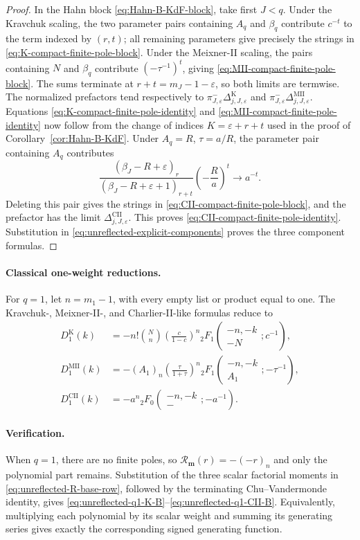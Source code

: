 \documentclass[10pt]{amsart}
\newcommand{\mm}{\boldsymbol m}
\newcommand{\pFq}[5]{{}_{#1}F_{#2}\!\left(\begin{matrix}#3\\#4\end{matrix};#5\right)}
\theoremstyle{plain}
\theoremstyle{definition}
\theoremstyle{remark}
\begin{document}
\begin{proof}
In the Hahn block \eqref{eq:Hahn-B-KdF-block}, take first $J<q$.
Under the Kravchuk scaling, the two parameter pairs containing
\(A_q\) and \(\beta_q\) contribute $c^{-t}$ to the term indexed by
\((r,t)\); all remaining parameters give precisely the strings in
\eqref{eq:K-compact-finite-pole-block}.  Under the Meixner-II scaling,
the pairs containing $N$ and \(\beta_q\) contribute
\((-\tau^{-1})^t\), giving
\eqref{eq:MII-compact-finite-pole-block}.  The sums terminate at
\(r+t=m_J-1-\varepsilon\), so both limits are termwise.  The normalized
prefactors tend respectively to
\(\pi_{J,\varepsilon}^{-}\Delta_{j,J,\varepsilon}^{\mathrm K}\)
and
\(\pi_{J,\varepsilon}^{-}\Delta_{j,J,\varepsilon}^{\mathrm{MII}}\).
Equations \eqref{eq:K-compact-finite-pole-identity} and
\eqref{eq:MII-compact-finite-pole-identity} now follow from the change of
indices $K=\varepsilon+r+t$ used in the proof of
Corollary~\ref{cor:Hahn-B-KdF}. Under
\(A_q=R\), \(\tau=a/R\), the parameter pair containing \(A_q\)
contributes
\[
 \frac{(\beta_J-R+\varepsilon)_r}
 {(\beta_J-R+\varepsilon+1)_{r+t}}
 \left(-\frac Ra\right)^t\longrightarrow a^{-t}.
\]
Deleting this pair gives the strings in
\eqref{eq:CII-compact-finite-pole-block}, and the prefactor has the
limit \(\Delta_{j,J,\varepsilon}^{\mathrm{CII}}\). This proves
\eqref{eq:CII-compact-finite-pole-identity}. Substitution in
\eqref{eq:unreflected-explicit-components} proves the three component
formulas.
\end{proof}

\paragraph{Classical one-weight reductions.}
For \(q=1\), let \(n=m_1-1\), with every empty list or product equal
to one. The Kravchuk-, Meixner-II-, and Charlier-II-like formulas reduce to
\begin{align}
 D_1^{\mathrm K}(k)
 &=-n!\binom Nn\left(\frac{c}{1-c}\right)^n
 \pFq{2}{1}{-n,-k}{-N}{c^{-1}},
 \label{eq:unreflected-q1-K-B}\\
 D_1^{\mathrm{MII}}(k)
 &=-(A_1)_n\left(\frac{\tau}{1+\tau}\right)^n
 \pFq{2}{1}{-n,-k}{A_1}{-\tau^{-1}},
 \label{eq:unreflected-q1-MII-B}\\
 D_1^{\mathrm{CII}}(k)
 &=-a^n\pFq{2}{0}{-n,-k}{-}{-a^{-1}}.
 \label{eq:unreflected-q1-CII-B}
\end{align}

\paragraph{Verification.}
When \(q=1\), there are no finite poles, so
\(\mathcal R_{\mm}(r)=-(-r)_n\) and only the polynomial part remains.
Substitution of the three scalar factorial moments in
\eqref{eq:unreflected-R-base-row}, followed by the terminating
Chu--Vandermonde identity, gives
\eqref{eq:unreflected-q1-K-B}--\eqref{eq:unreflected-q1-CII-B}.
Equivalently, multiplying each polynomial by its scalar weight and summing
its generating series gives exactly the corresponding signed generating
function.
\end{document}
